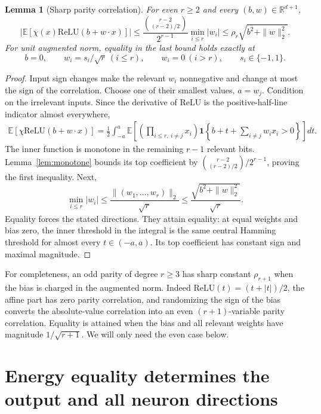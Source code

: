 \documentclass[11pt]{article}
\newtheorem{lemma}[theorem]{Lemma}
\newcommand{\R}{\mathbb R}
\newcommand{\E}{\mathbb E}
\newcommand{\relu}{\mathrm{ReLU}}
\begin{document}
\begin{lemma}[Sharp parity correlation]\label{lem:correlation}
For even $r\ge2$ and every $(b,w)\in\R^{d+1}$,
\begin{equation}\label{eq:correlation}
 \left|\E[\chi(x)\relu(b+w\cdot x)]\right|
 \le \frac{\binom{r-2}{(r-2)/2}}{2^{r-1}}
       \min_{i\le r}|w_i|
 \le\rho_r\sqrt{b^2+\|w\|_2^2}.
\end{equation}
For unit augmented norm, equality in the last bound holds exactly at
\[
 b=0,\qquad w_i=s_i/\sqrt r\ (i\le r),\qquad
 w_i=0\ (i>r),\qquad s_i\in\{-1,1\}.
\]
\end{lemma}
\begin{proof}
Input sign changes make the relevant $w_i$ nonnegative and change at
most the sign of the correlation. Choose one of their smallest values,
$a=w_j$. Condition on the irrelevant inputs. Since the derivative of
ReLU is the positive-half-line indicator almost everywhere,
\begin{align*}
 \E[\chi\relu(b+w\cdot x)]
 =\frac12\int_{-a}^a
 \E\left[\left(\prod_{i\le r,\ i\ne j}x_i\right)
 \mathbf1\left\{b+t+\sum_{i\ne j}w_ix_i>0\right\}\right]dt.
\end{align*}
The inner function is monotone in the remaining $r-1$ relevant bits.
Lemma~\ref{lem:monotone} bounds its top coefficient by
$\binom{r-2}{(r-2)/2}/2^{r-1}$, proving the first inequality.
Next,
\[
 \min_{i\le r}|w_i|\le
 \frac{\|(w_1,\ldots,w_r)\|_2}{\sqrt r}
 \le\frac{\sqrt{b^2+\|w\|_2^2}}{\sqrt r}.
\]
Equality forces the stated directions. They attain equality: at equal
weights and bias zero, the inner threshold in the integral is the same
central Hamming threshold for almost every $t\in(-a,a)$. Its top
coefficient has constant sign and maximal magnitude.
\end{proof}

For completeness, an odd parity of degree $r\ge3$ has sharp constant
$\rho_{r+1}$ when the bias is charged in the augmented norm. Indeed
$\relu(t)=(t+|t|)/2$, the affine part has zero parity correlation, and
randomizing the sign of the bias converts the absolute-value
correlation into an even $(r+1)$-variable parity correlation. Equality
is attained when the bias and all relevant weights have magnitude
$1/\sqrt{r+1}$. We will only need the even case below.

\section{Energy equality determines the output and all neuron directions}
\end{document}
